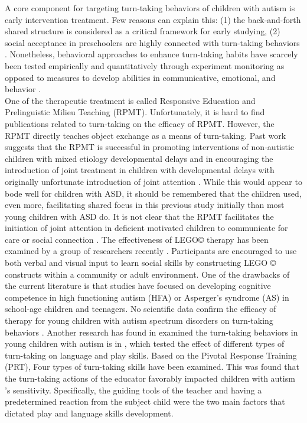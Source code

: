 A core component for targeting turn-taking behaviors of children with autism is early 
intervention treatment. Few reasons can explain this: (1) the back-and-forth shared structure
is considered as a critical framework for early studying, (2) social acceptance in preschoolers
are highly connected with turn-taking behaviors \cite{diamond2008promoting, guralnick1997designing, harrist2002dyadic, rieth2014identifying}.
Nonetheless, behavioral approaches to enhance turn-taking habits have scarcely been tested 
empirically and quantitatively through experiment monitoring as opposed to measures to develop 
abilities in communicative, emotional, and behavior \cite{brok2010engaging, diehl2012clinical, rieth2014identifying, scassellati2012robots}.\\

One of the therapeutic treatment is called Responsive Education and Prelinguistic Milieu
Teaching (RPMT). Unfortunately, it is hard to find publications related to turn-taking
on the efficacy of RPMT. However, the RPMT directly teaches object exchange as a means
of turn-taking. Past work suggests that the RPMT is successful in promoting interventions 
of non-autistic children with mixed etiology developmental delays and in encouraging the 
introduction of joint treatment in children with developmental delays with originally unfortunate 
introduction of joint attention \cite{yoder2002effects}. While this would appear to bode 
well for children with ASD, it should be remembered that the children used, even more, 
facilitating shared focus in this previous study initially than most young children 
with ASD do. It is not clear that the RPMT facilitates the initiation of joint attention 
in deficient motivated children to communicate for care or social connection \cite{yoder2006randomized}.
The effectiveness of LEGO© therapy has been examined by a group of researchers recently \cite{legoff2004use, legoff2006long, owens2008lego}.
Participants are encouraged to use both verbal and visual input to learn social skills 
by constructing LEGO © constructs within a community or adult environment. One of the 
drawbacks of the current literature is that studies have focused on developing cognitive 
competence in high functioning autism (HFA) or Asperger's syndrome (AS) in school-age 
children and teenagers. No scientific data confirm the efficacy of therapy for young 
children with autism spectrum disorders on turn-taking behaviors \cite{kim2015case}.
Another research has found in examined the turn-taking behaviors in young children with 
autism is in \cite{rieth2014identifying}, which tested the effect of different types of 
turn-taking on language and play skills. Based on the Pivotal Response Training (PRT), 
Four types of turn-taking skills have been examined. This was found that the turn-taking 
actions of the educator favorably impacted children with autism 's sensitivity. Specifically, 
the guiding tools of the teacher and having a predetermined reaction from the subject child 
were the two main factors that dictated play and language skills development.\\

